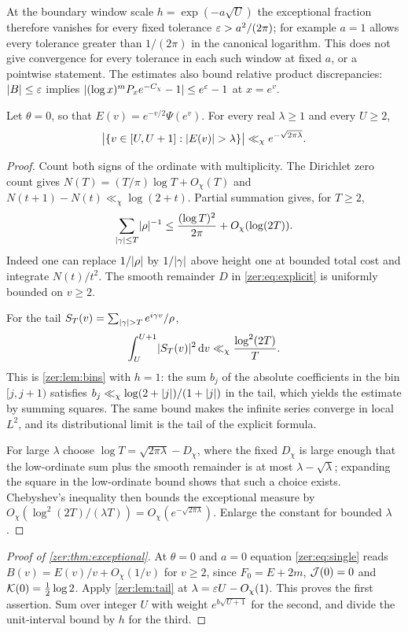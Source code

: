 At the boundary window scale $h=\exp(-a\sqrt U)$ the exceptional fraction therefore vanishes
for every fixed tolerance $\eps>a^2/(2\pi)$; for example $a=1$ allows every tolerance greater
than $1/(2\pi)$ in the canonical logarithm. This does not give convergence for every
tolerance in each such window at fixed $a$, or a pointwise statement. The estimates also
bound relative product discrepancies: $\abs B\le\eps$ implies
$\abs{(\log x)^mP_xe^{-C_\chi}-1}\le e^\eps-1$ at $x=e^v$.

\begin{lemma}\label{zer:lem:tail}
Let $\theta=0$, so that $E(v)=e^{-v/2}\Psi(e^v)$. For every real $\lambda\ge1$ and every
$U\ge2$,
\[
 \abs[\big]{\set{v\in[U,U+1]:\abs{E(v)}>\lambda}}\ll_\chi e^{-\sqrt{2\pi\lambda}} .
\]
\end{lemma}
\begin{proof}
Count both signs of the ordinate with multiplicity. The Dirichlet zero count
\cite{BennettMartinOBryantRechnitzer2021Counting} gives $N(T)=(T/\pi)\log T+O_\chi(T)$ and
$N(t+1)-N(t)\ll_\chi\log(2+t)$. Partial summation gives, for $T\ge2$,
\[
 \sum_{\abs\gamma\le T}\abs\rho^{-1}\le\frac{(\log T)^2}{2\pi}+O_\chi(\log(2T)).
\]
Indeed one can replace $1/\abs\rho$ by $1/\abs\gamma$ above height one at bounded total cost
and integrate $N(t)/t^2$. The smooth remainder $D$ in \eqref{zer:eq:explicit} is uniformly
bounded on $v\ge2$.

For the tail $S_T(v)=\sum_{\abs\gamma>T}e^{i\gamma v}/\rho$,
\[
 \int_U^{U+1}\abs{S_T(v)}^2\,\dd v\ll_\chi\frac{\log^2(2T)}T .
\]
This is \cref{zer:lem:bins} with $h=1$: the sum $b_j$ of the absolute coefficients in the bin
$[j,j+1)$ satisfies $b_j\ll_\chi\log(2+\abs j)/(1+\abs j)$ in the tail, which yields the
estimate by summing squares. The same bound makes the infinite series converge in local
$L^2$, and its distributional limit is the tail of the explicit formula.

For large $\lambda$ choose $\log T=\sqrt{2\pi\lambda}-D_\chi$, where the fixed $D_\chi$ is
large enough that the low-ordinate sum plus the smooth remainder is at most
$\lambda-\sqrt\lambda$; expanding the square in the low-ordinate bound shows that such a
choice exists. Chebyshev's inequality then bounds the exceptional measure by
$O_\chi(\log^2(2T)/(\lambda T))=O_\chi(e^{-\sqrt{2\pi\lambda}})$. Enlarge the constant for
bounded $\lambda$.
\end{proof}

\begin{proof}[Proof of \cref{zer:thm:exceptional}]
At $\theta=0$ and $a=0$ equation \eqref{zer:eq:single} reads $B(v)=E(v)/v+O_\chi(1/v)$ for
$v\ge2$, since $F_0=E+2m$, $\zerJ(0)=0$ and $\zerK(0)=\tfrac12\log2$. Apply
\cref{zer:lem:tail} at $\lambda=\eps U-O_\chi(1)$. This proves the first assertion. Sum over
integer $U$ with weight $e^{b\sqrt{U+1}}$ for the second, and divide the unit-interval bound
by $h$ for the third.
\end{proof}

